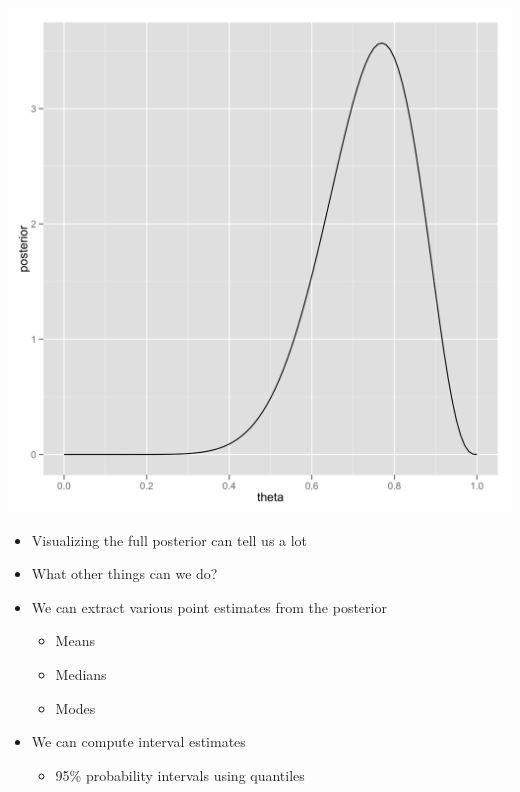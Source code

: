 \documentclass{beamer}
\begin{document}
\frame
{
  \begin{center}
    \includegraphics[scale = 0.1]{beta_distribution.png}
  \end{center}
}

\frame
{
  \begin{itemize}
    \item{Visualizing the full posterior can tell us a lot}
    \item{What other things can we do?}
  \end{itemize}
}

\frame
{
  \begin{itemize}
    \item{We can extract various point estimates from the posterior}
    \begin{itemize}
      \item{Means}
      \item{Medians}
      \item{Modes}
    \end{itemize}
    \item{We can compute interval estimates}
    \begin{itemize}
      \item{95\% probability intervals using quantiles}
    \end{itemize}
  \end{itemize}
}
\end{document}
